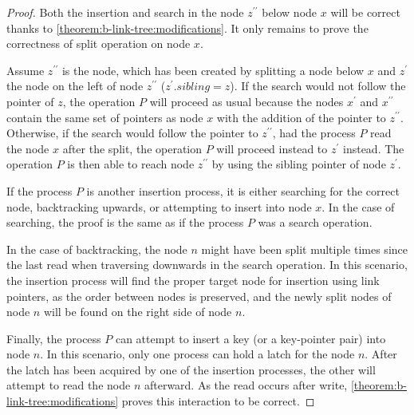 \begin{proof}
  Both the insertion and search in the node $z^{\prime\prime}$ below node $x$ will be correct thanks to \cref{theorem:b-link-tree:modifications}. It only remains to prove the correctness of split operation on node $x$.

  Assume $z^{\prime\prime}$ is the node, which has been created by splitting a node below $x$ and $z^\prime$ the node on the left of node $z^{\prime\prime}$ ($z^\prime.\mathit{sibling} = z$). If the search would not follow the pointer of $z$, the operation $P$ will proceed as usual because the nodes $x^\prime$ and $x^{\prime\prime}$ contain the same set of pointers as node $x$ with the addition of the pointer to $z^{\prime\prime}$. Otherwise, if the search would follow the pointer to $z^{\prime\prime}$, had the process $P$ read the node $x$ after the split, the operation $P$ will proceed instead to $z^\prime$ instead. The operation $P$ is then able to reach node $z^{\prime\prime}$ by using the sibling pointer of node $z^\prime$.

  If the process $P$ is another insertion process, it is either searching for the correct node, backtracking upwards, or attempting to insert into node $x$. In the case of searching, the proof is the same as if the process $P$ was a search operation.

  In the case of backtracking, the node $n$ might have been split multiple times since the last read when traversing downwards in the search operation. In this scenario, the insertion process will find the proper target node for insertion using link pointers, as the order between nodes is preserved, and the newly split nodes of node $n$ will be found on the right side of node $n$.

  Finally, the process $P$ can attempt to insert a key (or a key-pointer pair) into node $n$. In this scenario, only one process can hold a latch for the node $n$. After the latch has been acquired by one of the insertion processes, the other will attempt to read the node $n$ afterward. As the read occurs after write, \cref{theorem:b-link-tree:modifications} proves this interaction to be correct.

\end{proof}

